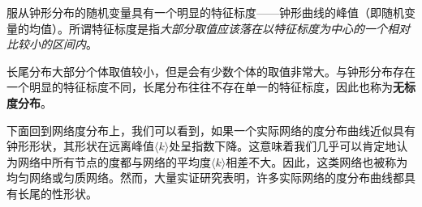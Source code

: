 \documentclass[a4paper]{article}
\begin{document}
\begin{spacing}{1.5}
%

服从钟形分布的随机变量具有一个明显的特征标度——钟形曲线的峰值（即随机变量的均值）。所谓特征标度是指\emph{大部分取值应该落在以特征标度为中心的一个相对比较小的区间内}。

%

长尾分布大部分个体取值较小，但是会有少数个体的取值非常大。与钟形分布存在一个明显的特征标度不同，长尾分布往往不存在单一的特征标度，因此也称为\textbf{无标度分布}。

下面回到网络度分布上，我们可以看到，如果一个实际网络的度分布曲线近似具有钟形形状，其形状在远离峰值$\langle k \rangle$处呈指数下降。这意味着我们几乎可以肯定地认为网络中所有节点的度都与网络的平均度$\langle k \rangle$相差不大。因此，这类网络也被称为均匀网络或匀质网络。然而，大量实证研究表明，许多实际网络的度分布曲线都具有长尾的性形状。


%
%
%
%
%
%


\end{spacing}
\end{document}
